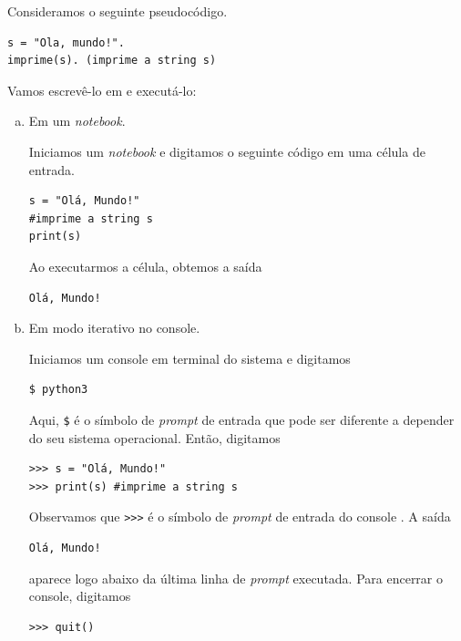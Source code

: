 \documentclass[12pt]{article}
\begin{document}
\begin{ex}
  Consideramos o seguinte pseudocódigo.

\begin{verbatim}
s = "Ola, mundo!".
imprime(s). (imprime a string s)
\end{verbatim}

Vamos escrevê-lo em {\python} e executá-lo:

\begin{enumerate}[a)]
  \item Em um \textit{notebook}.
  
  Iniciamos um \textit{notebook} {\python} e digitamos o seguinte código em uma célula de entrada.

\begin{lstlisting}
s = "Olá, Mundo!"
#imprime a string s
print(s)
\end{lstlisting}

  Ao executarmos a célula, obtemos a saída

\begin{verbatim}
Olá, Mundo!
\end{verbatim}

  \item Em modo iterativo no console.
  
  Iniciamos um console {\python} em terminal do sistema e digitamos

\begin{verbatim}
$ python3
\end{verbatim}

Aqui, \texttt{\$} é o símbolo de \textit{prompt} de entrada que pode ser diferente a depender do seu sistema operacional. Então, digitamos

\begin{lstlisting}
>>> s = "Olá, Mundo!"
>>> print(s) #imprime a string s
\end{lstlisting}

Observamos que \lstinline+>>>+ é o símbolo de \textit{prompt} de entrada do console {\python}. A saída 

\begin{lstlisting}
Olá, Mundo!
\end{lstlisting}

aparece logo abaixo da última linha de \textit{prompt} executada. Para encerrar o console, digitamos

\begin{lstlisting}
>>> quit()
\end{lstlisting}
  

\end{enumerate}
\end{ex}
\end{document}
